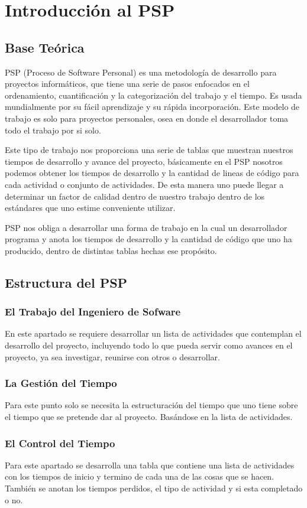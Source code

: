 \documentclass[a4paper,12pt,openany,oneside]{book}
\begin{document}
\chapter{Introducción al PSP}
\thispagestyle{empty}
\section{Base Teórica}
PSP (Proceso de Software Personal) es una metodología de desarrollo para proyectos informáticos, que tiene una serie de pasos enfocados en el ordenamiento, cuantificación y la categorización del trabajo y el tiempo. Es usada mundialmente por su fácil aprendizaje y su rápida incorporación. Este modelo de trabajo es solo para proyectos personales, osea en donde el desarrollador toma todo el trabajo por si solo.

Este tipo de trabajo nos proporciona una serie de tablas que muestran nuestros tiempos de desarrollo y avance del proyecto, básicamente en el PSP nosotros podemos obtener los tiempos de desarrollo y la cantidad de lineas de código para cada actividad o conjunto de actividades. De esta manera uno puede llegar a determinar un factor de calidad dentro de nuestro trabajo dentro de los estándares que uno estime conveniente utilizar.

PSP nos obliga a desarrollar una forma de trabajo en la cual un desarrollador programa y anota los tiempos de desarrollo y la cantidad de código que uno ha producido, dentro de distintas tablas hechas ese propósito.
\section{Estructura del PSP}
\subsection{El Trabajo del Ingeniero de Sofware}
En este apartado se requiere desarrollar un lista de actividades que contemplan el desarrollo del proyecto, incluyendo todo lo que pueda servir como avances en el proyecto, ya sea investigar, reunirse con otros o desarrollar.
\subsection{La Gestión del Tiempo}
Para este punto solo se necesita la estructuración del tiempo que uno tiene sobre el tiempo que se pretende dar al proyecto. Basándose en la lista de actividades.
\subsection{El Control del Tiempo}
Para este apartado se desarrolla una tabla que contiene una lista de actividades con los tiempos de inicio y termino de cada una de las cosas que se hacen. También se anotan los tiempos perdidos, el tipo de actividad y si esta completado o no.
\end{document}
